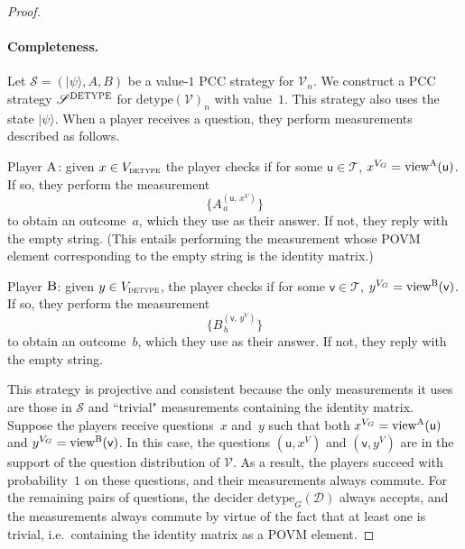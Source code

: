\documentclass[11pt]{article}
\theoremstyle{definition}
\newcommand{\ket}[1]{|#1\rangle}
\newcommand{\decider}{\mathcal{D}}
\newcommand{\verifier}{\mathcal{V}}
\newcommand{\strategy}{\mathscr{S}}
\newcommand{\detype}{\mathrm{detype}}
\newcommand{\type}{\mathcal{T}}
\newcommand{\gamestyle}[1]{\ensuremath{\textsc{#1}}\xspace}
\newcommand{\labelstyle}[1]{\ensuremath{\textsc{#1}}\xspace}
\newcommand{\tvarstyle}[1]{\mathsf{#1}}
\newcommand{\lvar}{\ensuremath{\tvarstyle{u}}}
\newcommand{\rvar}{\ensuremath{\tvarstyle{v}}}
\newcommand{\alice}{\labelstyle{A}}
\newcommand{\bob}{\labelstyle{B}}
\begin{document}
\begin{proof}
\paragraph{Completeness.}
Let $\strategy = (\ket{\psi},A, B)$ be a value-$1$ PCC strategy for
$\verifier_n$.
We construct a PCC strategy $\strategy^{\gamestyle{DETYPE}}$ for
$\detype(\verifier)_n$ with value~$1$.
This strategy also uses the state $\ket{\psi}$. 
When a player receives a question, they perform measurements described as
follows.
\begin{description}
\item Player \alice: given $x \in V_{\gamestyle{detype}}$ the player checks if
  for some $\lvar \in \type$, $x^{V_G} = \mathrm{view}^\alice(\lvar)$.
	If so, they perform the
  measurement
  \begin{equation*}
    \Big\{ A^{(\lvar,\, x^V)}_{\, a} \Big\}
  \end{equation*}
  to obtain an outcome~$a$, which they use as their answer.
	If not, they reply with the empty string.
	(This entails performing the measurement whose POVM element corresponding to
  the empty string is the identity matrix.)
\item Player \bob: given $y \in V_{\gamestyle{detype}}$, the player checks if
  for some $\rvar \in \type$, $y^{V_G} = \mathrm{view}^\bob(\rvar)$.
	If so, they perform the measurement
  \begin{equation*}
    \Big\{ B^{(\rvar,\, y^V)}_{\, b} \Big\}
  \end{equation*}
  to obtain an outcome~$b$, which they use as their answer.
	If not, they reply with the empty string.
\end{description}
This strategy is projective and consistent because the only measurements it uses
are those in $\strategy$ and ``trivial" measurements containing the identity
matrix.
Suppose the players receive questions~$x$ and~$y$ such that both $x^{V_G} =
\mathrm{view}^\alice(\lvar)$ and $y^{V_G} = \mathrm{view}^\bob(\rvar)$.
In this case, the questions $(\lvar, x^{V})$ and $(\rvar, y^{V})$ are in the
support of the question distribution of $\verifier$.
As a result, the players succeed with probability~$1$ on these questions, and
their measurements always commute.
For the remaining pairs of questions, the decider $\detype_G(\decider)$ always
accepts, and the measurements always commute by virtue of the fact that at least
one is trivial, i.e.\ containing the identity matrix as a POVM element.


\end{proof}
\end{document}
